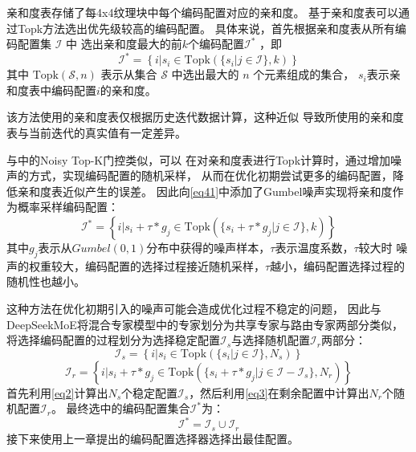 亲和度表存储了每4x4纹理块中每个编码配置对应的亲和度。
基于亲和度表可以通过Topk方法选出优先级较高的编码配置。
具体来说，首先根据亲和度表从所有编码配置集 $\mathcal{I}$ 中
选出亲和度最大的前$k$个编码配置$\mathcal{I}^*$ ，即
\begin{equation}
\label{eq41}
\mathcal{I}^*=\left\{i|s_i\in\text{Topk}(\{s_i|j\in\mathcal{I}\},k)\right\}
\end{equation}
其中 $\text{Topk}(\mathcal{S},n)$ 表示从集合 $\mathcal{S}$ 中选出最大的 $n$ 个元素组成的集合，
$s_i$表示亲和度表中编码配置$i$的亲和度。

该方法使用的亲和度表仅根据历史迭代数据计算，这种近似
导致所使用的亲和度表与当前迭代的真实值有一定差异。

与中的Noisy Top-K门控类似，可以
在对亲和度表进行Topk计算时，通过增加噪声的方式，实现编码配置的随机采样，
从而在优化初期尝试更多的编码配置，降低亲和度表近似产生的误差。
因此向\eqref{eq41}中添加了Gumbel噪声\cite{jang2016categorical}实现将亲和度作为概率采样编码配置：
\begin{equation}
\mathcal{I}^*=\left\{i|s_i+\tau*g_j\in\text{Topk}(\{s_i+\tau*g_j|j\in\mathcal{I}\},k)\right\}
\end{equation}
其中$g_j$表示从$Gumbel(0,1)$分布中获得的噪声样本，$\tau$表示温度系数，$\tau$较大时
噪声的权重较大，编码配置的选择过程接近随机采样，$\tau$越小，编码配置选择过程的随机性也越小。

这种方法在优化初期引入的噪声可能会造成优化过程不稳定的问题，
因此与DeepSeekMoE\cite{dai2024deepseekmoe}将混合专家模型中的专家划分为共享专家与路由专家两部分类似，
将选择编码配置的过程划分为选择稳定配置$\mathcal{I}_s$与选择随机配置$\mathcal{I}_r$两部分：
\begin{equation}
\label{eq2}
    \mathcal{I}_s=\left\{i|s_i\in\text{Topk}(\{s_i|j\in\mathcal{I}\},N_s)\right\}
\end{equation}
\begin{equation}
\label{eq3}
\mathcal{I}_r=\left\{i|s_i+\tau*g_j\in\text{Topk}(\{s_i+\tau*g_j|j\in\mathcal{I}-\mathcal{I}_s\},N_r)\right\}
\end{equation}
首先利用\eqref{eq2}计算出$N_s$个稳定配置$\mathcal{I}_s$，然后利用\eqref{eq3}在剩余配置中计算出$N_r$个随机配置$\mathcal{I}_r$。
最终选中的编码配置集合$\mathcal{I}^*$为：
\begin{equation}
\mathcal{I}^*=\mathcal{I}_{s}\cup\mathcal{I}_r
\end{equation}
接下来使用上一章提出的编码配置选择器选择出最佳配置。

